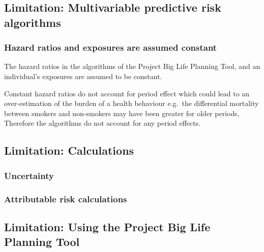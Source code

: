 \documentclass[]{book}
\begin{document}
\hypertarget{limitation-multivariable-predictive-risk-algorithms}{%
\subsection{Limitation: Multivariable predictive risk algorithms}\label{limitation-multivariable-predictive-risk-algorithms}}

\hypertarget{hazard-ratios-and-exposures-are-assumed-constant}{%
\subsubsection{Hazard ratios and exposures are assumed constant}\label{hazard-ratios-and-exposures-are-assumed-constant}}

The hazard ratios in the algorithms of the Project Big Life Planning Tool, and an individual's exposures are assumed to be constant.

Constant hazard ratios do not account for period effect which could lead to an over-estimation of the burden of a health behaviour e.g.~the differential mortality between smokers and non-smokers may have been greater for older periods, Therefore the algorithms do not account for any period effects.

\hypertarget{limitation-calculations}{%
\subsection{Limitation: Calculations}\label{limitation-calculations}}

\hypertarget{uncertainty}{%
\subsubsection{Uncertainty}\label{uncertainty}}

\hypertarget{attributable-risk-calculations}{%
\subsubsection{Attributable risk calculations}\label{attributable-risk-calculations}}

\hypertarget{limitation-using-the-project-big-life-planning-tool}{%
\subsection{Limitation: Using the Project Big Life Planning Tool}\label{limitation-using-the-project-big-life-planning-tool}}
\end{document}
